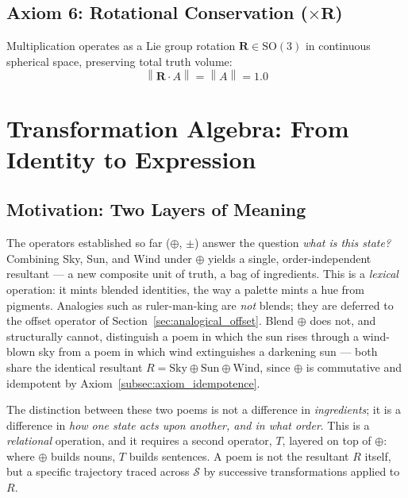 \documentclass[12pt, a4paper]{article}
\providecommand{\norm}[1]{\left\lVert#1\right\rVert}
\begin{document}
\subsection{Axiom 6: Rotational Conservation (\texorpdfstring{$\times \mathbf{R}$}{x R})}
\label{subsec:axiom_rotation}
Multiplication operates as a Lie group rotation $\mathbf{R} \in \mathrm{SO}(3)$ in continuous spherical space, preserving total truth volume:
\begin{equation}
    \norm{\mathbf{R} \cdot A} = \norm{A} = 1.0
\end{equation}

\section{Transformation Algebra: From Identity to Expression}
\label{sec:transformation_algebra}

\subsection{Motivation: Two Layers of Meaning}
\label{subsec:transform_motivation}
The operators established so far ($\oplus$, $\pm$) answer the question
\emph{what is this state?} Combining Sky, Sun, and Wind under $\oplus$
yields a single, order-independent resultant --- a new composite unit
of truth, a bag of ingredients. This is a \emph{lexical} operation: it mints blended identities, the way
a palette mints a hue from pigments. Analogies such as ruler-man-king are \emph{not} blends; they are deferred to the offset operator of Section~\ref{sec:analogical_offset}. Blend $\oplus$ does not, and structurally
cannot, distinguish a poem in which the sun rises through a wind-blown
sky from a poem in which wind extinguishes a darkening sun --- both
share the identical resultant
$R = \text{Sky} \oplus \text{Sun} \oplus \text{Wind}$, since $\oplus$
is commutative and idempotent by Axiom~\ref{subsec:axiom_idempotence}.

The distinction between these two poems is not a difference in
\emph{ingredients}; it is a difference in \emph{how one state acts
upon another, and in what order}. This is a \emph{relational}
operation, and it requires a second operator, $T$, layered on top of
$\oplus$: where $\oplus$ builds nouns, $T$ builds sentences. A poem is
not the resultant $R$ itself, but a specific trajectory traced across
$\mathcal{S}$ by successive transformations applied to $R$.
\end{document}
